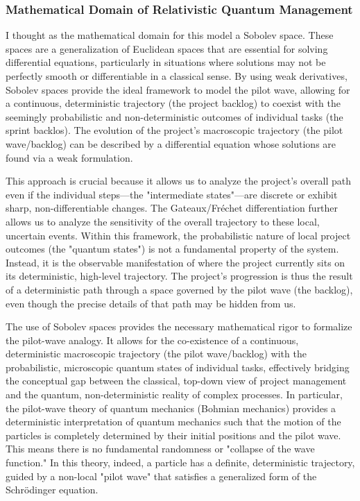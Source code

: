 \documentclass{article}
\begin{document}
\subsubsection*{Mathematical Domain of Relativistic Quantum Management}
I thought as the mathematical domain for this model a Sobolev space. These spaces are a generalization of Euclidean spaces that are essential for solving differential equations, particularly in situations where solutions may not be perfectly smooth or differentiable in a classical sense. By using weak derivatives, Sobolev spaces provide the ideal framework to model the pilot wave, allowing for a continuous, deterministic trajectory (the project backlog) to coexist with the seemingly probabilistic and non-deterministic outcomes of individual tasks (the sprint backlos). The evolution of the project's macroscopic trajectory (the pilot wave/backlog) can be described by a differential equation whose solutions are found via a weak formulation. 

This approach is crucial because it allows us to analyze the project's overall path even if the individual steps—the "intermediate states"—are discrete or exhibit sharp, non-differentiable changes. The Gateaux/Fréchet differentiation further allows us to analyze the sensitivity of the overall trajectory to these local, uncertain events. Within this framework, the probabilistic nature of local project outcomes (the "quantum states") is not a fundamental property of the system. Instead, it is the observable manifestation of where the project currently sits on its deterministic, high-level trajectory. The project's progression is thus the result of a deterministic path through a space governed by the pilot wave (the backlog), even though the precise details of that path may be hidden from us.

The use of Sobolev spaces provides the necessary mathematical rigor to formalize the pilot-wave analogy. It allows for the co-existence of a continuous, deterministic macroscopic trajectory (the pilot wave/backlog) with the probabilistic, microscopic quantum states of individual tasks, effectively bridging the conceptual gap between the classical, top-down view of project management and the quantum, non-deterministic reality of complex processes. In particular, the pilot-wave theory of quantum mechanics (Bohmian mechanics) \cite{bohm1952suggested1} provides a deterministic interpretation of quantum mechanics such that the motion of the particles is completely determined by their initial positions and the pilot wave. This means there is no fundamental randomness or "collapse of the wave function." In this theory, indeed, a particle has a definite, deterministic trajectory, guided by a non-local "pilot wave" that satisfies a generalized form of the Schrödinger equation.
\end{document}
